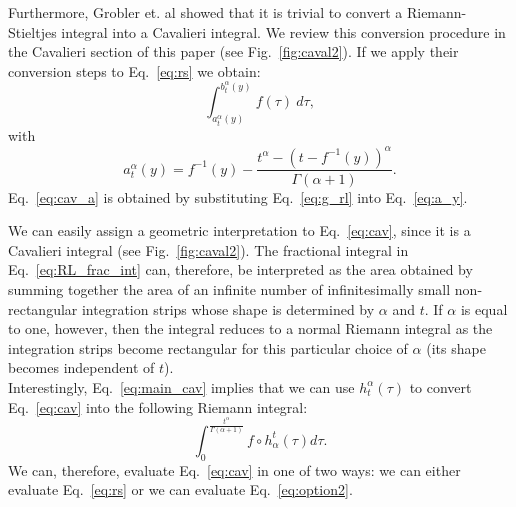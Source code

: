\documentclass{article}
\theoremstyle{theorem}
\theoremstyle{definition}
\begin{document}
\noindent
Furthermore, Grobler et. al showed that it is trivial to convert a Riemann-Stieltjes integral into a Cavalieri integral. We review this conversion procedure in the Cavalieri section of this paper (see Fig.~\ref{fig:caval2}). If we apply their conversion steps to Eq.~\eqref{eq:rs} we obtain:
\begin{equation}
\label{eq:cav}
\int_{a_t^{\alpha}(y)}^{b_t^{\alpha}(y)} f(\tau)~d\tau, 
\end{equation}
with
\begin{equation}
\label{eq:cav_a}
a_t^{\alpha}(y) = f^{-1}(y) - \frac{t^{\alpha}-(t-f^{-1}(y))^{\alpha}}{\Gamma(\alpha+1)}.
\end{equation}
Eq.~\eqref{eq:cav_a} is obtained by substituting Eq.~\eqref{eq:g_rl} into Eq.~\eqref{eq:a_y}.

\noindent
We can easily assign a geometric interpretation to Eq.~\eqref{eq:cav}, since it is a Cavalieri integral (see Fig.~\ref{fig:caval2}). The fractional integral in Eq.~\eqref{eq:RL_frac_int} can, therefore, be interpreted as the area obtained 
by summing together the area of an infinite number of infinitesimally small non-rectangular integration strips whose shape is determined by $\alpha$ and $t$. If $\alpha$ is equal to one, however, then the integral reduces to a normal Riemann integral as the integration strips become rectangular for this particular choice of $\alpha$ (its shape becomes independent of $t$).\\

\noindent
Interestingly, Eq.~\eqref{eq:main_cav} implies that we can use $h_t^{\alpha}(\tau)$ to convert Eq.~\eqref{eq:cav} into the following Riemann integral:
\begin{equation}
\label{eq:option2}
\int_0^{\frac{t^{\alpha}}{\Gamma(\alpha+1)}} f\circ h_{\alpha}^t (\tau) d\tau.  
\end{equation}
We can, therefore, evaluate Eq.~\eqref{eq:cav} in one of two ways: we can either evaluate Eq.~\eqref{eq:rs} or we can evaluate Eq.~\eqref{eq:option2}.
\end{document}
